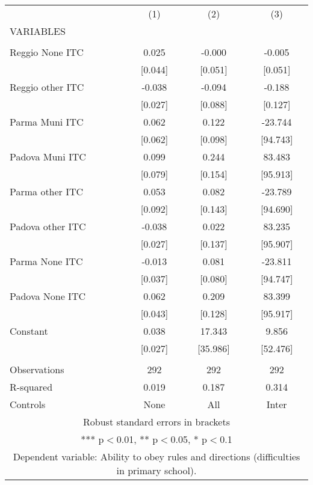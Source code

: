 \begin{tabular}{lccc} \hline
 & (1) & (2) & (3) \\
VARIABLES &  &  &  \\ \hline
 &  &  &  \\
Reggio None ITC & 0.025 & -0.000 & -0.005 \\
 & [0.044] & [0.051] & [0.051] \\
Reggio other ITC & -0.038 & -0.094 & -0.188 \\
 & [0.027] & [0.088] & [0.127] \\
Parma Muni ITC & 0.062 & 0.122 & -23.744 \\
 & [0.062] & [0.098] & [94.743] \\
Padova Muni ITC & 0.099 & 0.244 & 83.483 \\
 & [0.079] & [0.154] & [95.913] \\
Parma other ITC & 0.053 & 0.082 & -23.789 \\
 & [0.092] & [0.143] & [94.690] \\
Padova other ITC & -0.038 & 0.022 & 83.235 \\
 & [0.027] & [0.137] & [95.907] \\
Parma None ITC & -0.013 & 0.081 & -23.811 \\
 & [0.037] & [0.080] & [94.747] \\
Padova None ITC & 0.062 & 0.209 & 83.399 \\
 & [0.043] & [0.128] & [95.917] \\
Constant & 0.038 & 17.343 & 9.856 \\
 & [0.027] & [35.986] & [52.476] \\
 &  &  &  \\
Observations & 292 & 292 & 292 \\
R-squared & 0.019 & 0.187 & 0.314 \\
 Controls & None & All & Inter \\ \hline
\multicolumn{4}{c}{ Robust standard errors in brackets} \\
\multicolumn{4}{c}{ *** p$<$0.01, ** p$<$0.05, * p$<$0.1} \\
\multicolumn{4}{c}{ Dependent variable: Ability to obey rules and directions (difficulties in primary school).} \\
\end{tabular}
